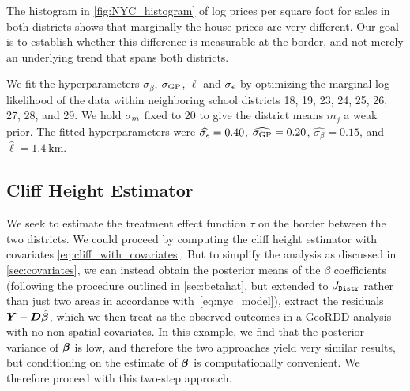 The histogram in \autoref{fig:NYC_histogram} of log prices per square foot for sales in both districts shows that marginally the house prices are very different.
Our goal is to establish whether this difference is measurable at the border, and not merely an underlying trend that spans both districts.

We fit the hyperparameters \(\sigma_\beta\), \(\sigma_{\mathrm{GP}}\), \(\ell\) and \(\sigma_{\epsilon}\) by optimizing the marginal log-likelihood of the data within neighboring school districts 18, 19, 23, 24, 25, 26, 27, 28, and 29.
We hold \(\sigma_{m}\) fixed to 20 to give the district means \(m_j\) a weak prior.
The fitted hyperparameters were \(\widehat{\sigma_{\epsilon}}=0.40\), \(\widehat{\sigma_{\mathrm{GP}}}=0.20\), \(\widehat{\sigma_\beta}=0.15\), and \(\widehat{\ell}=1.4~\text{km}\).

\subsection{Cliff Height Estimator}

We seek to estimate the treatment effect function \(\tau\) on the border between the two districts.
We could proceed by computing the cliff height estimator with covariates \autoref{eq:cliff_with_covariates}.
But to simplify the analysis as discussed in \autoref{sec:covariates}, we can instead obtain the posterior means of the \(\beta\) coefficients (following the procedure outlined in \autoref{sec:betahat}, but extended to \(J_{\mathtt{Distr}}\) rather than just two areas in accordance with~\autoref{eq:nyc_model}), extract the residuals \(\bm{Y}{}-\bm{D} \hat{\bm{\beta}}\), which we then treat as the observed outcomes in a GeoRDD analysis with no non-spatial covariates.
In this example, we find that the posterior variance of \(\bm{\beta}\) is low, and therefore the two approaches yield very similar results, but conditioning on the estimate of \(\bm{\beta}\) is computationally convenient.
We therefore proceed with this two-step approach.

